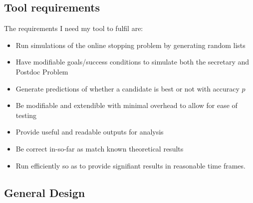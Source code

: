 \documentclass[a4paper,11pt]{article}
\begin{document}
\subsection{Tool requirements}

The requirements I need my tool to fulfil are:

\begin{itemize}
\item Run simulations of the online stopping problem by generating random lists
\item Have modifiable goals/success conditions to simulate both the secretary and Postdoc Problem
\item Generate predictions of whether a candidate is best or not with accuracy $p$
\item Be modifiable and extendible with minimal overhead to allow for ease of testing
\item Provide useful and readable outputs for analysis
\item Be correct in-so-far as match known theoretical results
\item Run efficiently so as to provide signifiant results in reasonable time frames.
\end{itemize}

\subsection{General Design}
\end{document}
